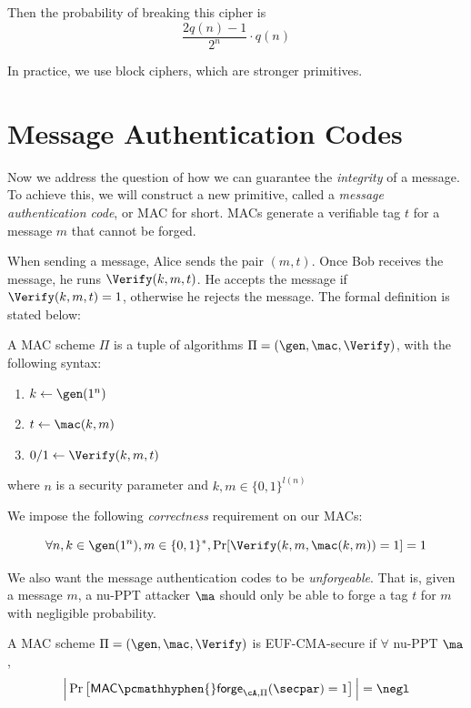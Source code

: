 Then the probability of breaking this cipher is
$$\frac{2q(n) - 1}{2^n} \cdot q(n)$$

In practice, we use block ciphers, which are stronger primitives.

\section{Message Authentication Codes}
Now we address the question of how we can guarantee the \textit{integrity} of a message.
To achieve this, we will construct a new primitive, called a \textit{message authentication code}, or MAC for short. MACs generate a verifiable tag $t$ for a message $m$ that cannot be forged.

When sending a message, Alice sends the pair $(m, t)$.
Once Bob receives the message, he runs $\Verify(k, m, t)$.
He accepts the message if $\Verify(k, m, t) = 1$, otherwise he rejects the message.
The formal definition is stated below:
\begin{definition}
    A MAC scheme $\Pi$ is a tuple of algorithms $\Pi = (\gen, \mac, \Verify)$, with the following syntax:
    \begin{enumerate}
        \item $k \leftarrow \gen(1^n)$
        \item $t \leftarrow \mac(k,m)$
        \item $0/1 \leftarrow \Verify(k, m, t)$
    \end{enumerate}
    where $n$ is a security parameter and $k, m \in \{0, 1\}^{l(n)}$
\end{definition}

We impose the following \textit{correctness} requirement on our MACs:
\begin{definition}
    $$\forall n, k \in \gen(1^n), m \in \{0, 1\}^*, \Pr[\Verify(k, m, \mac(k, m)) = 1] = 1$$
\end{definition}

We also want the message authentication codes to be \textit{unforgeable}.
That is, given a message $m$, a nu-PPT attacker $\ma$ should only be able to forge a tag $t$ for $m$ with negligible probability.
\begin{definition}
    A MAC scheme $\Pi = (\gen,\mac,\Verify)$ is EUF-CMA-secure if $\forall$ nu-PPT $\ma$,
    $$\Big| \Pr\left[\mathsf{MAC}\pcmathhyphen{}\mathsf{forge}_{\cA, \Pi}(\secpar) =1\right]\Big| = \negl$$
\end{definition}

